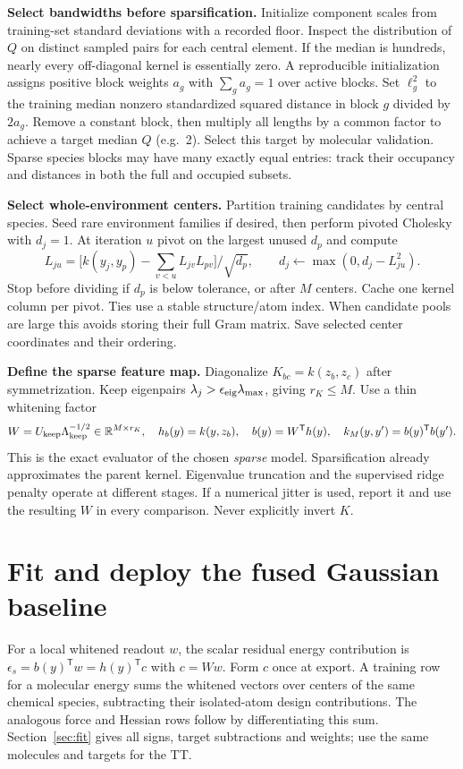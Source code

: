 \documentclass[11pt,a4paper]{article}
\newcommand{\R}{\mathbb R}\newcommand{\dd}{\mathrm d}
\newcommand{\T}{\mathsf T}\newcommand{\tr}{\operatorname{tr}}
\begin{document}
\textbf{Select bandwidths before sparsification.} Initialize component scales from training-set standard deviations with a recorded floor. Inspect the distribution of $Q$ on distinct sampled pairs for each central element. If the median is hundreds, nearly every off-diagonal kernel is essentially zero. A reproducible initialization assigns positive block weights $a_g$ with $\sum_g a_g=1$ over active blocks. Set $\ell_g^2$ to the training median nonzero standardized squared distance in block $g$ divided by $2a_g$. Remove a constant block, then multiply all lengths by a common factor to achieve a target median $Q$ (e.g.\ 2). Select this target by molecular validation. Sparse species blocks may have many exactly equal entries: track their occupancy and distances in both the full and occupied subsets.

\textbf{Select whole-environment centers.} Partition training candidates by central species. Seed rare environment families if desired, then perform pivoted Cholesky with $d_j=1$. At iteration $u$ pivot on the largest unused $d_p$ and compute
\[
 L_{ju}=\big[k(y_j,y_p)-\sum_{v<u}L_{jv}L_{pv}\big]/\sqrt{d_p},
 \qquad d_j\gets\max(0,d_j-L_{ju}^2).
\]
Stop before dividing if $d_p$ is below tolerance, or after $M$ centers. Cache one kernel column per pivot. Ties use a stable structure/atom index. When candidate pools are large this avoids storing their full Gram matrix. Save selected center coordinates and their ordering.

\textbf{Define the sparse feature map.} Diagonalize $K_{bc}=k(z_b,z_c)$ after symmetrization. Keep eigenpairs $\lambda_j>\epsilon_{\rm eig}\lambda_{\max}$, giving $r_K\le M$. Use a thin whitening factor
\begin{equation}
 W=U_{\rm keep}\Lambda_{\rm keep}^{-1/2}\in\R^{M\times r_K},\quad
 h_b(y)=k(y,z_b),\quad b(y)=W^\T h(y),\quad
 k_M(y,y')=b(y)^\T b(y'). \label{eq:nys}
\end{equation}
This is the exact evaluator of the chosen \emph{sparse} model. Sparsification already approximates the parent kernel. Eigenvalue truncation and the supervised ridge penalty operate at different stages. If a numerical jitter is used, report it and use the resulting $W$ in every comparison. Never explicitly invert $K$.

\pg\section{Fit and deploy the fused Gaussian baseline}\label{sec:fusedfit}
For a local whitened readout $w$, the scalar residual energy contribution is $\epsilon_s=b(y)^\T w=h(y)^\T c$ with $c=Ww$. Form $c$ once at export. A training row for a molecular energy sums the whitened vectors over centers of the same chemical species, subtracting their isolated-atom design contributions. The analogous force and Hessian rows follow by differentiating this sum. Section~\ref{sec:fit} gives all signs, target subtractions and weights; use the same molecules and targets for the TT.
\end{document}
